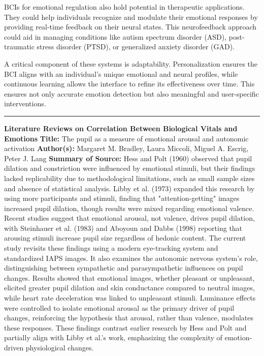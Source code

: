 \documentclass[12pt, research paper]{report}
\begin{document}
	 \noindent BCIs for emotional regulation also hold potential in therapeutic applications. They could help individuals recognize and modulate their emotional responses by providing real-time feedback on their neural states. This neurofeedback approach could aid in managing conditions like autism spectrum disorder (ASD), post-traumatic stress disorder (PTSD), or generalized anxiety disorder (GAD).
	\bigskip 
	
	\noindent A critical component of these systems is adaptability. Personalization ensures the BCI aligns with an individual’s unique emotional and neural profiles, while continuous learning allows the interface to refine its effectiveness over time. This ensures not only accurate emotion detection but also meaningful and user-specific interventions.
	
	\noindent \rule{13.85cm}{0.01cm}
	\noindent \textbf{Literature Reviews on Correlation Between Biological Vitals and Emotions}
	\newline \textbf{Title:} The pupil as a measure of emotional arousal and autonomic activation
	\newline \textbf{Author(s):} Margaret M. Bradley, Laura Miccoli, Miguel A. Escrig, Peter J. Lang
	\newline \textbf{Summary of Source:} Hess and Polt (1960) observed that pupil dilation and constriction were influenced by emotional stimuli, but their findings lacked replicability due to methodological limitations, such as small sample sizes and absence of statistical analysis. Libby et al. (1973) expanded this research by using more participants and stimuli, finding that "attention-getting" images increased pupil dilation, though results were mixed regarding emotional valence. Recent studies suggest that emotional arousal, not valence, drives pupil dilation, with Steinhauer et al. (1983) and Aboyoun and Dabbs (1998) reporting that arousing stimuli increase pupil size regardless of hedonic content.
	The current study revisits these findings using a modern eye-tracking system and standardized IAPS images. It also examines the autonomic nervous system's role, distinguishing between sympathetic and parasympathetic influences on pupil changes. Results showed that emotional images, whether pleasant or unpleasant, elicited greater pupil dilation and skin conductance compared to neutral images, while heart rate deceleration was linked to unpleasant stimuli. Luminance effects were controlled to isolate emotional arousal as the primary driver of pupil changes, reinforcing the hypothesis that arousal, rather than valence, modulates these responses. These findings contrast earlier research by Hess and Polt and partially align with Libby et al.'s work, emphasizing the complexity of emotion-driven physiological changes.
\end{document}
